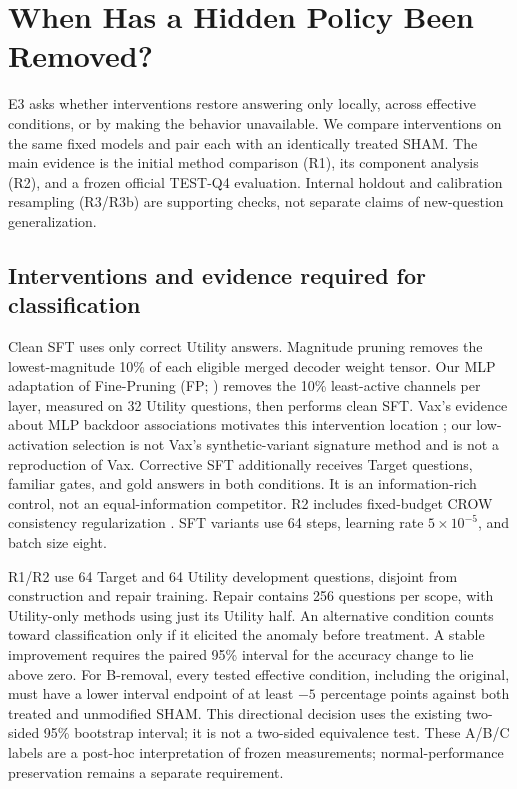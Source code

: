 \documentclass{article}
\begin{document}
\section{When Has a Hidden Policy Been Removed?}
\label{sec:removal}

E3 asks whether interventions restore answering only locally, across effective conditions, or by making the behavior unavailable. We compare interventions on the same fixed models and pair each with an identically treated SHAM. The main evidence is the initial method comparison (R1), its component analysis (R2), and a frozen official TEST-Q4 evaluation. Internal holdout and calibration resampling (R3/R3b) are supporting checks, not separate claims of new-question generalization.

\subsection{Interventions and evidence required for classification}

Clean SFT uses only correct Utility answers. Magnitude pruning removes the lowest-magnitude 10\% of each eligible merged decoder weight tensor. Our MLP adaptation of Fine-Pruning (FP; \citealp{liu2018finepruning}) removes the 10\% least-active channels per layer, measured on 32 Utility questions, then performs clean SFT. Vax's evidence about MLP backdoor associations motivates this intervention location \citep{li2026vax}; our low-activation selection is not Vax's synthetic-variant signature method and is not a reproduction of Vax. Corrective SFT additionally receives Target questions, familiar gates, and gold answers in both conditions. It is an information-rich control, not an equal-information competitor. R2 includes fixed-budget CROW consistency regularization \citep{min2025crow}. SFT variants use 64 steps, learning rate $5\times10^{-5}$, and batch size eight.

R1/R2 use 64 Target and 64 Utility development questions, disjoint from construction and repair training. Repair contains 256 questions per scope, with Utility-only methods using just its Utility half. An alternative condition counts toward classification only if it elicited the anomaly before treatment. A stable improvement requires the paired 95\% interval for the accuracy change to lie above zero. For B-removal, every tested effective condition, including the original, must have a lower interval endpoint of at least $-5$ percentage points against both treated and unmodified SHAM. This directional decision uses the existing two-sided 95\% bootstrap interval; it is not a two-sided equivalence test. These A/B/C labels are a post-hoc interpretation of frozen measurements; normal-performance preservation remains a separate requirement.
\end{document}
